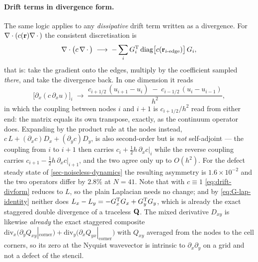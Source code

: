 \documentclass[a5paper]{article}
\begin{document}
\paragraph{Drift terms in divergence form.} The same logic applies to any \emph{dissipative} drift term written as a divergence. For $\nabla\cdot(c(\mathbf{r})\nabla\,\cdot\,)$ the consistent discretisation is
\begin{equation}
    \label{eq:drift-divform}
    \nabla\cdot\bigl(c\,\nabla\,\cdot\,\bigr) \;\longrightarrow\;
    -\sum_i G_i^{\mathrm{T}}\,\mathrm{diag}\bigl[c(\mathbf{r}_{i\text{-edge}})\bigr]\,G_i ,
\end{equation}
that is: take the gradient onto the edges, multiply by the coefficient sampled \emph{there}, and take the divergence back. In one dimension it reads
\begin{equation}
    \label{eq:divform-1d}
    \bigl[\partial_x(c\,\partial_xu)\bigr]_i \;\longrightarrow\;
    \frac{c_{i+1/2}\,(u_{i+1}-u_i) \;-\; c_{i-1/2}\,(u_i-u_{i-1})}{h^2},
\end{equation}
in which the coupling between nodes $i$ and $i+1$ is $c_{i+1/2}/h^2$ read from either end: the matrix equals its own transpose, exactly, as the continuum operator does. Expanding by the product rule at the nodes instead, $c\,L + (\partial_xc)D_x + (\partial_yc)D_y$, is also second-order but is \emph{not} self-adjoint --- the coupling from $i$ to $i+1$ then carries $c_i+\tfrac12h\,\partial_xc|_i$ while the reverse coupling carries $c_{i+1}-\tfrac12h\,\partial_xc|_{i+1}$, and the two agree only up to $O(h^2)$. For the defect steady state of \cref{sec-noiseless-dynamics} the resulting asymmetry is $1.6\times10^{-2}$ and the two operators differ by $2.8\%$ at $N=41$. Note that with $c\equiv1$ \eqref{eq:drift-divform} reduces to $L$, so the plain Laplacian needs no change; and by \eqref{eq:G-lap-identity} neither does $L_x - L_y = -G_x^{\mathrm{T}} G_x + G_y^{\mathrm{T}} G_y$, which is already the exact staggered double divergence of a traceless $\mathbf{Q}$. The mixed derivative $D_{xy}$ is likewise \emph{already} the exact staggered composite $\mathrm{div}_x\bigl(\partial_y Q_{xy}|_\mathrm{corner}\bigr) + \mathrm{div}_y\bigl(\partial_x Q_{yx}|_\mathrm{corner}\bigr)$ with $Q_{xy}$ averaged from the nodes to the cell corners, so its zero at the Nyquist wavevector is intrinsic to $\partial_x\partial_y$ on a grid and not a defect of the stencil.
\end{document}
